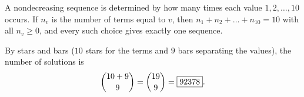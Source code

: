 A nondecreasing sequence is determined by how many times each value $1,2,\dots,10$ occurs. If $n_v$ is the number of terms equal to $v$, then $n_1+n_2+\dots+n_{10}=10$ with all $n_v\ge0$, and every such choice gives exactly one sequence.

By stars and bars ($10$ stars for the terms and $9$ bars separating the values), the number of solutions is
\[
\dbinom{10+9}{9}=\dbinom{19}{9}=\boxed{92378}.
\]
